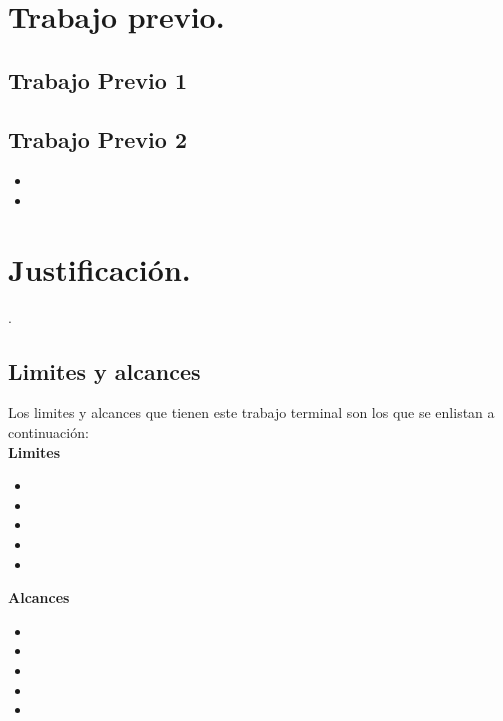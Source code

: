 \documentclass[12pt, a4paper, titlepage]{report}
\begin{document}
		\section{Trabajo previo.}
    	    
        \lipsum[3] 
            
            \subsection{Trabajo Previo 1}
        \lipsum[3] 
                
            \subsection{Trabajo Previo 2}
        \lipsum[3]
                \begin{itemize}
                    \item         \lipsum[2] 
                    \item         \lipsum[2] 
                \end{itemize}
            
 
            \lipsum[2] 
		
    	\section{Justificación.}
    	    \lipsum[2] \cite{refRivestSeguridad}.
    	    
    	    \subsection{Limites y alcances}
    	    Los limites y alcances que tienen este trabajo terminal son los que se enlistan a continuación:\\
	
        	\textbf{Limites}
            \begin{itemize}
        	\item \lipsum[1]
        	    \item \lipsum[3]
        	    \item \lipsum[4]
        	    \item \lipsum[5]
        	    \item \lipsum[6]
        	\end{itemize}
        	
        	\textbf{Alcances}
        	\begin{itemize}
        	    \item \lipsum[7]
        	    \item \lipsum[8]
        	    \item \lipsum[9]
        	    \item \lipsum[10]
        	    \item \lipsum[11]
            \end{itemize}
    	
\end{document}
